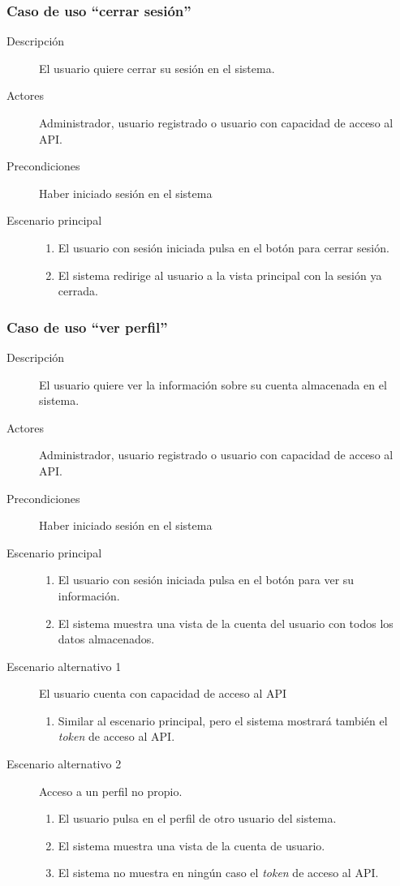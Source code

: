 \subsubsection{Caso de uso ``cerrar sesión''}
\begin{description}
\item[Descripción] 			El usuario quiere cerrar su sesión en el sistema.
\item[Actores] 				Administrador, usuario registrado o usuario con capacidad de acceso al API.
\item[Precondiciones]  		Haber iniciado sesión en el sistema
\item[Escenario principal] 	\hfill
						 	\begin{enumerate}
							\item El usuario con sesión iniciada pulsa en el botón para cerrar sesión.
							\item El sistema redirige al usuario a la vista principal con la sesión ya cerrada.
							\end{enumerate}							
\end{description}


\subsubsection{Caso de uso ``ver perfil''}
\begin{description}
\item[Descripción] 			El usuario quiere ver la información sobre su cuenta almacenada en el sistema.
\item[Actores] 				Administrador, usuario registrado o usuario con capacidad de acceso al API.
\item[Precondiciones]  		Haber iniciado sesión en el sistema
\item[Escenario principal] 	\hfill
						 	\begin{enumerate}
							\item El usuario con sesión iniciada pulsa en el botón para ver su información.
							\item El sistema muestra una vista de la cuenta del usuario con todos los datos almacenados.
							\end{enumerate}
\item[Escenario alternativo 1] El usuario cuenta con capacidad de acceso al API
							\begin{enumerate}
							\item Similar al escenario principal, pero el sistema mostrará también el \textit{token} de acceso al API.
							\end{enumerate}
\item [Escenario alternativo 2] Acceso a un perfil no propio.
							\begin{enumerate}
							\item El usuario pulsa en el perfil de otro usuario del sistema.
							\item El sistema muestra una vista de la cuenta de usuario.
							\item El sistema no muestra en ningún caso el \textit{token} de acceso al API.
							\end{enumerate}							
\end{description}


